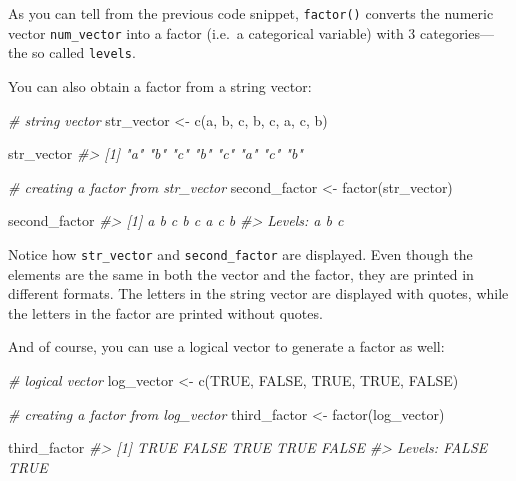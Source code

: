 \documentclass[
]{book}
\newenvironment{Shaded}{\begin{snugshade}}{\end{snugshade}}
\newcommand{\CommentTok}[1]{\textcolor[rgb]{0.56,0.35,0.01}{\textit{#1}}}
\newcommand{\ConstantTok}[1]{\textcolor[rgb]{0.00,0.00,0.00}{#1}}
\newcommand{\FunctionTok}[1]{\textcolor[rgb]{0.00,0.00,0.00}{#1}}
\newcommand{\NormalTok}[1]{#1}
\newcommand{\OtherTok}[1]{\textcolor[rgb]{0.56,0.35,0.01}{#1}}
\newcommand{\StringTok}[1]{\textcolor[rgb]{0.31,0.60,0.02}{#1}}
\begin{document}
As you can tell from the previous code snippet, \texttt{factor()} converts the numeric
vector \texttt{num\_vector} into a factor (i.e.~a categorical variable) with 3
categories---the so called \texttt{levels}.

You can also obtain a factor from a string vector:

\begin{Shaded}
\begin{Highlighting}[]
\CommentTok{\# string vector}
\NormalTok{str\_vector }\OtherTok{\textless{}{-}} \FunctionTok{c}\NormalTok{(}\StringTok{\textquotesingle{}a\textquotesingle{}}\NormalTok{, }\StringTok{\textquotesingle{}b\textquotesingle{}}\NormalTok{, }\StringTok{\textquotesingle{}c\textquotesingle{}}\NormalTok{, }\StringTok{\textquotesingle{}b\textquotesingle{}}\NormalTok{, }\StringTok{\textquotesingle{}c\textquotesingle{}}\NormalTok{, }\StringTok{\textquotesingle{}a\textquotesingle{}}\NormalTok{, }\StringTok{\textquotesingle{}c\textquotesingle{}}\NormalTok{, }\StringTok{\textquotesingle{}b\textquotesingle{}}\NormalTok{)}

\NormalTok{str\_vector}
\CommentTok{\#\textgreater{} [1] "a" "b" "c" "b" "c" "a" "c" "b"}

\CommentTok{\# creating a factor from str\_vector}
\NormalTok{second\_factor }\OtherTok{\textless{}{-}} \FunctionTok{factor}\NormalTok{(str\_vector)}

\NormalTok{second\_factor}
\CommentTok{\#\textgreater{} [1] a b c b c a c b}
\CommentTok{\#\textgreater{} Levels: a b c}
\end{Highlighting}
\end{Shaded}

Notice how \texttt{str\_vector} and \texttt{second\_factor} are displayed. Even though the
elements are the same in both the vector and the factor, they are printed in
different formats. The letters in the string vector are displayed with quotes,
while the letters in the factor are printed without quotes.

And of course, you can use a logical vector to generate a factor as well:

\begin{Shaded}
\begin{Highlighting}[]
\CommentTok{\# logical vector}
\NormalTok{log\_vector }\OtherTok{\textless{}{-}} \FunctionTok{c}\NormalTok{(}\ConstantTok{TRUE}\NormalTok{, }\ConstantTok{FALSE}\NormalTok{, }\ConstantTok{TRUE}\NormalTok{, }\ConstantTok{TRUE}\NormalTok{, }\ConstantTok{FALSE}\NormalTok{)}

\CommentTok{\# creating a factor from log\_vector}
\NormalTok{third\_factor }\OtherTok{\textless{}{-}} \FunctionTok{factor}\NormalTok{(log\_vector)}

\NormalTok{third\_factor}
\CommentTok{\#\textgreater{} [1] TRUE  FALSE TRUE  TRUE  FALSE}
\CommentTok{\#\textgreater{} Levels: FALSE TRUE}
\end{Highlighting}
\end{Shaded}
\end{document}
